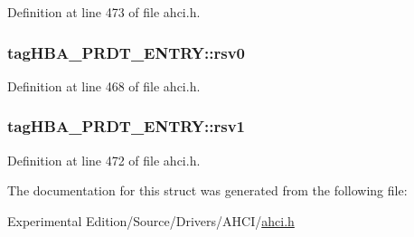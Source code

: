 Definition at line 473 of file ahci.\+h.

\subsubsection[{\texorpdfstring{rsv0}{rsv0}}]{ tag\+H\+B\+A\+\_\+\+P\+R\+D\+T\+\_\+\+E\+N\+T\+R\+Y\+::rsv0}\hypertarget{structtagHBA__PRDT__ENTRY_a73f608e05caeffce5ba5404f07e63561}{}\label{structtagHBA__PRDT__ENTRY_a73f608e05caeffce5ba5404f07e63561}


Definition at line 468 of file ahci.\+h.

\subsubsection[{\texorpdfstring{rsv1}{rsv1}}]{ tag\+H\+B\+A\+\_\+\+P\+R\+D\+T\+\_\+\+E\+N\+T\+R\+Y\+::rsv1}\hypertarget{structtagHBA__PRDT__ENTRY_a435810364fcb775552b75b2d6e59461c}{}\label{structtagHBA__PRDT__ENTRY_a435810364fcb775552b75b2d6e59461c}


Definition at line 472 of file ahci.\+h.



The documentation for this struct was generated from the following file\+:\begin{DoxyCompactItemize}
\item 
Experimental Edition/\+Source/\+Drivers/\+A\+H\+C\+I/\hyperlink{ahci_8h}{ahci.\+h}\end{DoxyCompactItemize}
